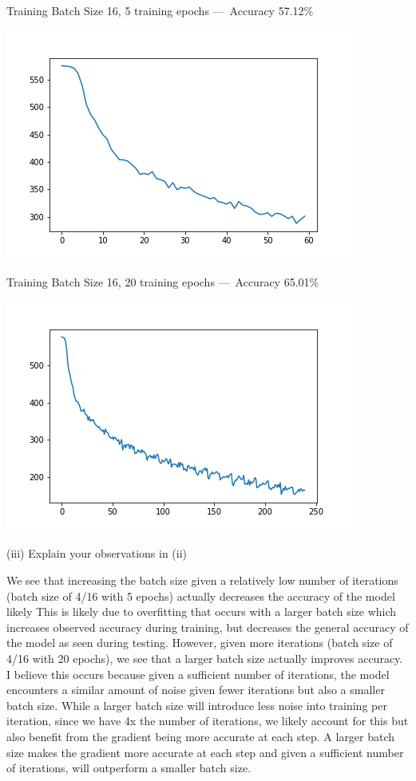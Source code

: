 \documentclass[answers]{exam}
\begin{document}
\begin{solution}
Training Batch Size 16, 5 training epochs — Accuracy 57.12\%
\begin{center}
\includegraphics[scale=0.75]{Images/loss-16-5.png}
\end{center}

Training Batch Size 16, 20 training epochs — Accuracy 65.01\%
\begin{center}
\includegraphics[scale=0.75]{Images/loss-16-20.png}
\end{center}

\end{solution}
(iii) Explain your observations in (ii) 
\begin{solution}
We see that increasing the batch size given a relatively low number of iterations (batch size of 4/16 with 5 epochs) actually decreases the accuracy of the model likely  This is likely due to overfitting that occurs with a larger batch size which increases observed accuracy during training, but decreases the general accuracy of the model as seen during testing. However, given more iterations (batch size of 4/16 with 20 epochs), we see that a larger batch size actually improves accuracy. I believe this occurs because given a sufficient number of iterations, the model encounters a similar amount of noise given fewer iterations but also a smaller batch size. While a larger batch size will introduce less noise into training per iteration, since we have 4x the number of iterations, we likely account for this but also benefit from the gradient being more accurate at each step. A larger batch size makes the gradient more accurate at each step and given a sufficient number of iterations, will outperform a smaller batch size.
\end{solution}
\end{document}

